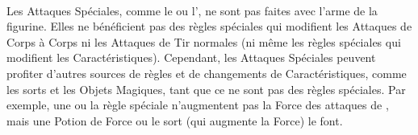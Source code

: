 {\begin{framed}
\begin{multicols}{3}
\hyperlink{notaleader}{\notaleader}\newline
\hyperlink{armourpiercing}{\armourpiercing{}}\newline
\hyperlink{fear}{\fear}\newline
\hyperlink{stomp}{\stomp{}}\newline
\hyperlink{warplatform}{\warplatform}\newline
\hyperlink{reload}{\reload}\newline
\hyperlink{lightningreflexes}{\lightningreflexes}\newline
\hyperlink{regeneration}{\regeneration{}}\newline
\hyperlink{magicresistance}{\magicresistance{}}\newline
\hyperlink{wardsave}{\wardsave{}}\newline
\hyperlink{stupidity}{\stupidity}\newline
\hyperlink{stubborn}{\stubborn}\newline
\hyperlink{terror}{\terror}\newline
\hyperlink{volleyfire}{\volleyfire}\newline
\hyperlink{quicktofire}{\quicktofire}\newline
\hyperlink{multipleshots}{\multipleshots{}}\newline
\hyperlink{skirmisher}{\skirmisher}\newline
\hyperlink{impacthits}{\impacthits{}}\newline
\hyperlink{lighttroops}{\lighttroops}\newline
\hyperlink{fly}{\fly{}}
\end{multicols}
\setlength\columnseprule{0pt}
\vspace*{-10pt}
\end{framed}
}

\paragraph{}

Les Attaques Spéciales, comme le \stomp{} ou l'\breathweapon{}, ne sont pas faites avec l'arme de la figurine. Elles ne bénéficient pas des règles spéciales qui modifient les Attaques de Corps à Corps ni les Attaques de Tir normales (ni même les règles spéciales qui modifient les Caractéristiques). Cependant, les Attaques Spéciales peuvent profiter d'autres sources de règles et de changements de Caractéristiques, comme les sorts et les Objets Magiques, tant que ce ne sont pas des règles spéciales. Par exemple, une \gw{} ou la règle spéciale \thunderouscharge{} n'augmentent pas la Force des attaques de \stomp{}, mais une Potion de Force ou le sort \og \wildernesssignature{} \fg{} (qui augmente la Force) le font.

